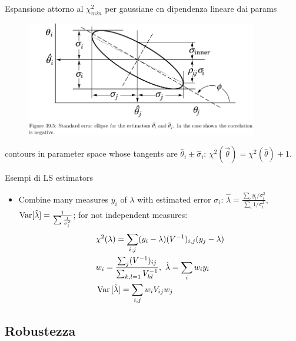 \documentclass[asd-beamer.tex]{subfiles}
\begin{document}
\begin{frame}{Espansione attorno al $\chi^2_{min}$ per gaussiane cn dipendenza lineare dai params}
	\begin{figure}
	\centering
	\includegraphics[width=0.9\textwidth,keepaspectratio]{figures/james/estimators/estimatorvar}
	\label{fig:estimatorvar}
\end{figure}
contours in parameter space whose tangents are $\hat{\theta}_i\pm\hat{\sigma}_i$: $\chi^2(\vec{\theta})=\chi^2(\hat{\theta})+1$.
\end{frame}

\begin{frame}{Esempi di LS estimators}
\begin{itemize}
\item Combine many measures $y_i$ of $\lambda$ with estimated error $\sigma_i$: $\hat{\lambda}=\frac{\sum_iy_i/\sigma_i^2}{\sum_i1/\sigma_i^2}$, $\operatorname{Var}[\hat{\lambda}]=\frac{1}{\sum\frac{1}{\sigma_i^2}}$; for not independent measures:
\begin{align*}
&\chi^2(\lambda)=\sum_{i,j}(y_i-\lambda)(\invers{V})_{i,j}(y_j-\lambda)\\
&w_i=\frac{\sum_j(\invers{V})_{ij}}{\sum_{k,l=1}\invers{V}_{kl}},\ \hat{\lambda}=\sum_iw_iy_i\\
&\var{[\hat{\lambda}]}=\sum_{i,j}w_iV_{ij}w_j
\end{align*}
\end{itemize}
\end{frame}

\subsection{Robustezza}
\end{document}
